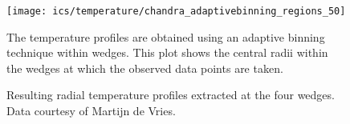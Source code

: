 \documentclass[MScProj_TLRH_ClusterEnergy.tex]{subfiles}
\begin{document}
\begin{figure}
    \centering
    \texttt{[image: ics/temperature/chandra\_adaptivebinning\_regions\_50]}
    \caption{The temperature profiles are obtained using an adaptive binning
             technique within wedges. This plot shows the central radii within 
             the wedges at which the observed data points are taken.}
    \label{fig:AdaptiveRadiiOfWedges}

    \caption{Resulting radial temperature profiles extracted at the four wedges.
             Data courtesy of Martijn de Vries.}
    \label{fig:ObservedWedgeProfiles}
\end{figure}



\SubfileBibliography
\end{document}
